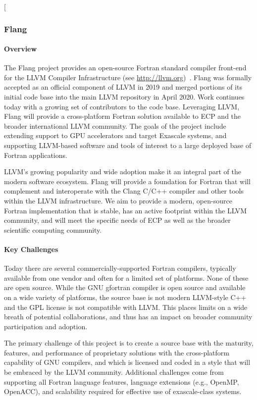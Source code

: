 [\subsubsection{ Flang}\label{subsubsect:flang}

\paragraph{Overview}

The Flang project provides an open-source Fortran standard 
\cite{iso-fortran-2004, iso-fortran-2010, iso-fortran-2018}
compiler front-end for the LLVM Compiler Infrastructure (see
\url{http://llvm.org})~\cite{llvm:homepage}.  Flang was formally
accepted as an official component of LLVM in 2019 and merged portions
of its initial code base into the main LLVM repository in April 2020. 
Work continues today with a growing set of contributors to the
code base.  Leveraging LLVM, Flang will provide a
cross-platform Fortran solution available to ECP and the broader
international LLVM community. The goals of the project include
extending support to GPU accelerators and target Exascale systems, and
supporting LLVM-based software and tools of interest to a large
deployed base of Fortran applications.

LLVM's growing popularity and wide adoption make it an integral part
of the modern software ecosystem. Flang will provide a foundation
for Fortran that will complement and interoperate with the
Clang C/C++ compiler and other tools within the LLVM infrastructure.
We aim to provide a modern, open-source Fortran implementation that is
stable, has an active footprint within the LLVM community, and will
meet the specific needs of ECP as well as the broader scientific
computing community.

\paragraph{Key Challenges}
Today there are several commercially-supported Fortran compilers,
typically available from one vendor and often for a limited set of
platforms.  None of these are open source.  While the GNU gfortran compiler is
open source and available on a wide variety of platforms, the source base is not modern
LLVM-style C++ and the GPL license is not compatible with
LLVM.  This places limits on a wide breath of potential collaborations, and thus has an
impact on broader community participation and adoption.

The primary challenge of this project is to create a source base with
the maturity, features, and performance of proprietary solutions with
the cross-platform capability of GNU compilers, and which is licensed
and coded in a style that will be embraced by the LLVM community. 
Additional challenges come from supporting all Fortran
language features, language extensions (e.g., OpenMP, OpenACC), and
scalability required for effective use of exascale-class systems. 

